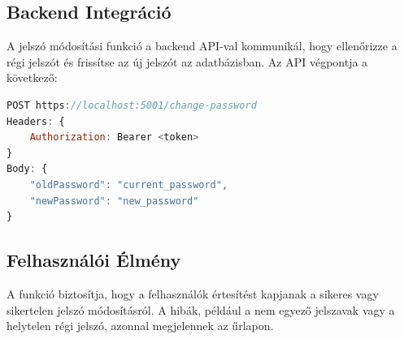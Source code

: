 \documentclass[colorlinks]{thesis-kando}
\theoremstyle{definition}
\theoremstyle{remark}
\begin{document}
\subsection{Backend Integráció}
A jelszó módosítási funkció a backend API-val kommunikál, hogy ellenőrizze a régi jelszót és frissítse az új jelszót az adatbázisban. Az API végpontja a következő:

\begin{lstlisting}[language=JavaScript]
POST https://localhost:5001/change-password
Headers: {
    Authorization: Bearer <token>
}
Body: {
    "oldPassword": "current_password",
    "newPassword": "new_password"
}
\end{lstlisting}

\subsection{Felhasználói Élmény}
A funkció biztosítja, hogy a felhasználók értesítést kapjanak a sikeres vagy sikertelen jelszó módosításról. A hibák, például a nem egyező jelszavak vagy a helytelen régi jelszó, azonnal megjelennek az űrlapon.
\end{document}
